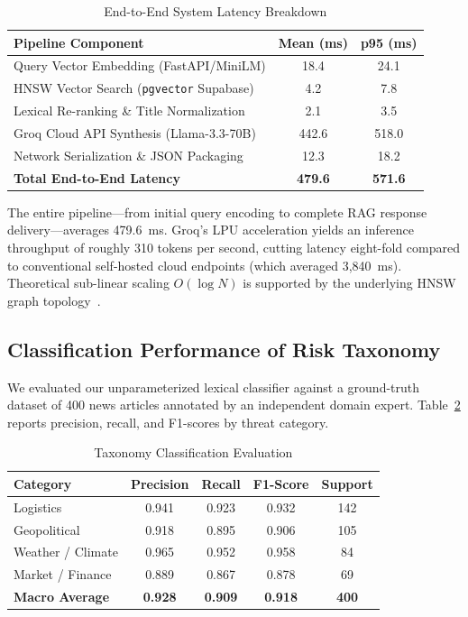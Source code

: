 \documentclass[conference]{IEEEtran}
\begin{document}
\begin{table}[t]
\caption{End-to-End System Latency Breakdown}
\label{tab:latency}
\centering
\setlength{\tabcolsep}{6pt}
\footnotesize
\begin{tabular}{lcc}
\toprule
\textbf{Pipeline Component} & \textbf{Mean (ms)} & \textbf{p95 (ms)} \\
\midrule
Query Vector Embedding (FastAPI/MiniLM) & 18.4 & 24.1 \\
HNSW Vector Search (\texttt{pgvector} Supabase) & 4.2 & 7.8 \\
Lexical Re-ranking \& Title Normalization & 2.1 & 3.5 \\
Groq Cloud API Synthesis (Llama-3.3-70B) & 442.6 & 518.0 \\
Network Serialization \& JSON Packaging & 12.3 & 18.2 \\
\midrule
\textbf{Total End-to-End Latency} & \textbf{479.6} & \textbf{571.6} \\
\bottomrule
\end{tabular}
\end{table}

The entire pipeline---from initial query encoding to complete RAG response delivery---averages 479.6~ms. Groq's LPU acceleration yields an inference throughput of roughly 310 tokens per second, cutting latency eight-fold compared to conventional self-hosted cloud endpoints (which averaged 3,840~ms). Theoretical sub-linear scaling $O(\log N)$ is supported by the underlying HNSW graph topology~\cite{malkov2020efficient}.

\subsection{Classification Performance of Risk Taxonomy}
We evaluated our unparameterized lexical classifier against a ground-truth dataset of 400 news articles annotated by an independent domain expert. Table~\ref{tab:classification} reports precision, recall, and F1-scores by threat category.

\begin{table}[t]
\caption{Taxonomy Classification Evaluation}
\label{tab:classification}
\centering
\setlength{\tabcolsep}{5pt}
\footnotesize
\begin{tabular}{lcccc}
\toprule
\textbf{Category} & \textbf{Precision} & \textbf{Recall} & \textbf{F1-Score} & \textbf{Support} \\
\midrule
Logistics & 0.941 & 0.923 & 0.932 & 142 \\
Geopolitical & 0.918 & 0.895 & 0.906 & 105 \\
Weather / Climate & 0.965 & 0.952 & 0.958 & 84 \\
Market / Finance & 0.889 & 0.867 & 0.878 & 69 \\
\midrule
\textbf{Macro Average} & \textbf{0.928} & \textbf{0.909} & \textbf{0.918} & \textbf{400} \\
\bottomrule
\end{tabular}
\end{table}
\end{document}
